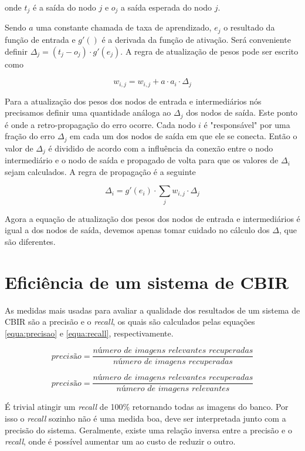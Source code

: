 onde $t_j$ é a saída do nodo $j$ e $o_j$ a saída esperada do nodo $j$.

Sendo $a$ uma constante chamada de taxa de aprendizado, $e_j$ o resultado da função de entrada e $g'()$ é a derivada da função de ativação. Será conveniente definir $\Delta_j = (t_j - o_j) \cdot g'(e_j)$. A regra de atualização de pesos pode ser escrito como

\begin{equation}
	w_{i,j} = w_{i,j} + a \cdot a_i \cdot \Delta_j
\end{equation}

Para a atualização dos pesos dos nodos de entrada e intermediários nós precisamos definir uma quantidade análoga ao $\Delta_j$ dos nodos de saída. Este ponto é onde a retro-propagação do erro ocorre. Cada nodo $i$ é "responsável" por uma fração do erro $\Delta_j$ em cada um dos nodos de saída em que ele se conecta. Então o valor de $\Delta_j$ é dividido de acordo com a influência da conexão entre o nodo intermediário e o nodo de saída e propagado de volta para que os valores de $\Delta_i$ sejam calculados. A regra de propagação é a seguinte

\begin{equation}
	\Delta_i = g'(e_i) \cdot \sum_j w_{i,j} \cdot \Delta_j
\end{equation}

Agora a equação de atualização dos pesos dos nodos de entrada e intermediários é igual a dos nodos de saída, devemos apenas tomar cuidado no cálculo dos $\Delta$, que são diferentes.

\section{Eficiência de um sistema de CBIR}

As medidas mais usadas para avaliar a qualidade dos resultados de um sistema de CBIR são a precisão e o \textit{recall}, os quais são calculados pelas equações \ref{equa:precisao} e \ref{equa:recall}, respectivamente.

\begin{equation}
	\textit{precisão} = \frac{\textit{número de imagens relevantes recuperadas}}{\textit{número de imagens recuperadas}}
	\label{equa:precisao}
\end{equation}

\begin{equation}
	\textit{precisão} = \frac{\textit{número de imagens relevantes recuperadas}}{\textit{número de imagens relevantes}}
	\label{equa:recall}
\end{equation}

É trivial atingir um \textit{recall} de 100\% retornando todas as imagens do banco. Por isso o \textit{recall} sozinho não é uma medida boa, deve ser interpretada junto com a precisão do sistema. Geralmente, existe uma relação inversa entre a precisão e o \textit{recall}, onde é possível aumentar um ao custo de reduzir o outro.
